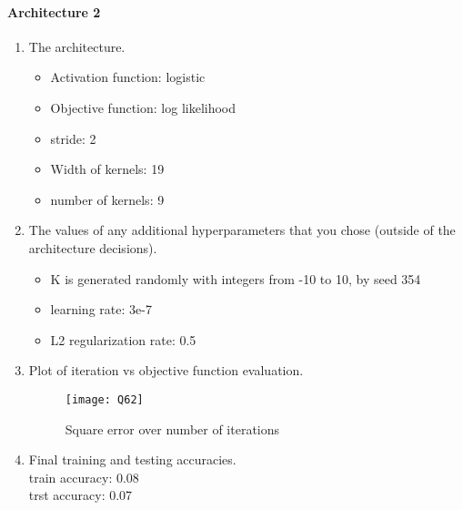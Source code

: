 \documentclass[12pt]{article}
\begin{document}
\paragraph{Architecture 2}
\begin{enumerate}
\item The architecture.
\begin{itemize}
\item[]Activation function: logistic
\item[]Objective function: log likelihood
\item[]stride: 2
\item[]Width of kernels: 19
\item[]number of kernels: 9
\end{itemize}

\item The values of any additional hyperparameters that you chose (outside of the architecture decisions).
\begin{itemize}
\item[]K is generated randomly with integers from -10 to 10, by seed 354
\item[]learning rate: 3e-7
\item[]L2 regularization rate: 0.5
\end{itemize}

\item Plot of iteration vs objective function evaluation.
\begin{figure}[H]
\centering
\texttt{[image: Q62]}
\caption{Square error over number of iterations}
\end{figure} 
\item Final training and testing accuracies.\\
train accuracy: 0.08\\
trst accuracy: 0.07
\end{enumerate}
\end{document}
